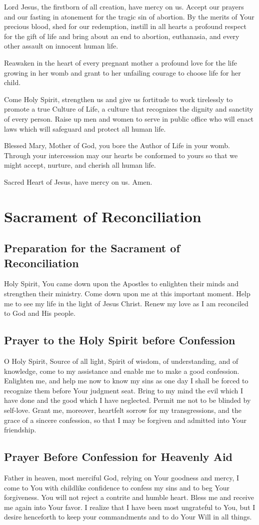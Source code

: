 \documentclass[12pt]{article}
\newcommand{\prayersection}[1]{\section{#1}}
\newcommand{\prayertitle}[1]{\subsection{#1}}
\begin{document}
Lord Jesus, the firstborn of all creation, have mercy on us. 
Accept our prayers and our fasting in atonement for the tragic sin of abortion. 
By the merits of Your precious blood, shed for our redemption, instill in all hearts a profound respect for the gift of life and bring about an end to abortion, euthanasia, and every other assault on innocent human life.

Reawaken in the heart of every pregnant mother a profound love for the life growing in her womb and grant to her unfailing courage to choose life for her child.

Come Holy Spirit, strengthen us and give us fortitude to work tirelessly to promote a true Culture of Life, a culture that recognizes the dignity and sanctity of every person.
Raise up men and women to serve in public office who will enact laws which will safeguard and protect all human life.

Blessed Mary, Mother of God, you bore the Author of Life in your womb. 
Through your intercession may our hearts be conformed to yours so that we might accept, nurture, and cherish all human life.

Sacred Heart of Jesus, have mercy on us. Amen.

\newpage

\prayersection{Sacrament of Reconciliation}
\prayertitle{Preparation for the Sacrament of Reconciliation}
Holy Spirit,
You came down upon the Apostles to enlighten their minds and strengthen their ministry.
Come down upon me at this important moment.
Help me to see my life in the light of Jesus Christ.
Renew my love as I am reconciled to God and His people.

\prayertitle{Prayer to the Holy Spirit before Confession}
O Holy Spirit, Source of all light, Spirit of wisdom, of understanding, and of knowledge, come to my assistance and enable me to make a good confession.
Enlighten me, and help me now to know my sins as one day I shall be forced to recognize them before Your judgment seat.
Bring to my mind the evil which I have done and the good which I have neglected.
Permit me not to be blinded by self-love.
Grant me, moreover, heartfelt sorrow for my transgressions, and the grace of a sincere confession, so that I may be forgiven and admitted into Your friendship.

\prayertitle{Prayer Before Confession for Heavenly Aid}
Father in heaven, most merciful God, relying on Your goodness and mercy, I come to You with childlike confidence to confess my sins and to beg Your forgiveness.
You will not reject a contrite and humble heart.
Bless me and receive me again into Your favor.
I realize that I have been most ungrateful to You, but I desire henceforth to keep your commandments and to do Your Will in all things.
\end{document}
